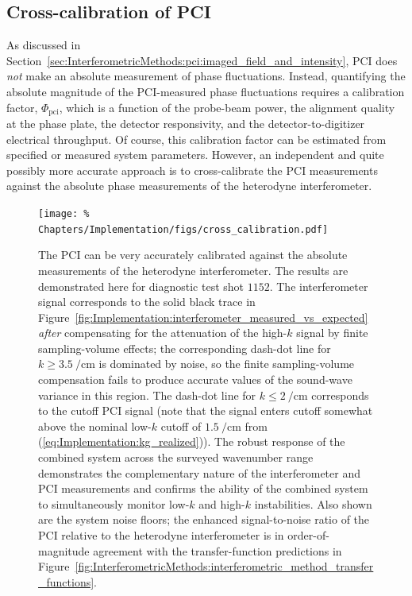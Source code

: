 \subsection{Cross-calibration of PCI}
\label{sec:Implementation:Calibration:pci}
As discussed in
Section~\ref{sec:InterferometricMethods:pci:imaged_field_and_intensity},
PCI does \emph{not} make an absolute measurement of phase fluctuations.
Instead, quantifying the absolute magnitude
of the PCI-measured phase fluctuations
requires a calibration factor, $\Phi_{\text{pci}}$,
which is a function of
the probe-beam power,
the alignment quality at the phase plate,
the detector responsivity, and
the detector-to-digitizer electrical throughput.
Of course, this calibration factor can be estimated
from specified or measured system parameters.
However, an independent and quite possibly more accurate approach
is to cross-calibrate the PCI measurements
against the absolute phase measurements
of the heterodyne interferometer.

\begin{figure}
  \centering
  \texttt{[image: \%
    Chapters/Implementation/figs/cross\_calibration.pdf]}
  \caption[Cross-calibration of PCI]{%
    The PCI can be very accurately calibrated
    against the absolute measurements of the heterodyne interferometer.
    The results are demonstrated here for diagnostic test shot $1152$.
    The interferometer signal corresponds to
    the solid black trace in
    Figure~\ref{fig:Implementation:interferometer_measured_vs_expected}
    \emph{after} compensating for the attenuation of the high-$k$ signal
    by finite sampling-volume effects;
    the corresponding dash-dot line for $k \geq \SI{3.5}{\per\centi\meter}$
    is dominated by noise, so the finite sampling-volume compensation
    fails to produce accurate values of the sound-wave variance
    in this region.
    The dash-dot line for $k \leq \SI{2}{\per\centi\meter}$
    corresponds to the cutoff PCI signal
    (note that the signal enters cutoff somewhat above
    the nominal low-$k$ cutoff of $\SI{1.5}{\per\centi\meter}$
    from (\ref{eq:Implementation:kg_realized})).
    The robust response of the combined system
    across the surveyed wavenumber range
    demonstrates the complementary nature
    of the interferometer and PCI measurements and
    confirms the ability of the combined system
    to simultaneously monitor low-$k$ and high-$k$ instabilities.
    Also shown are the system noise floors;
    the enhanced signal-to-noise ratio of the PCI
    relative to the heterodyne interferometer
    is in order-of-magnitude agreement with
    the transfer-function predictions in
    Figure~\ref{fig:InterferometricMethods:interferometric_method_transfer_functions}.
  }
\label{fig:Implementation:cross_calibration}
\end{figure}

